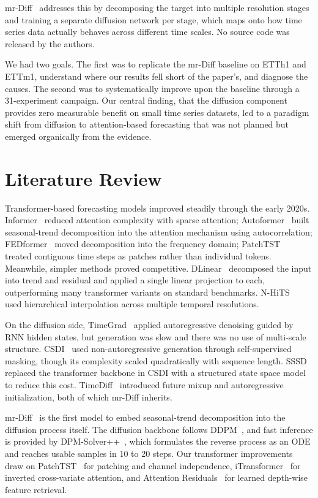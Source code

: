 \documentclass[conference]{IEEEtran}
\begin{document}
mr-Diff~\cite{mrdiff} addresses this by decomposing the target into multiple resolution stages and training a separate diffusion network per stage, which maps onto how time series data actually behaves across different time scales. No source code was released by the authors.

We had two goals. The first was to replicate the mr-Diff baseline on ETTh1 and ETTm1, understand where our results fell short of the paper's, and diagnose the causes. The second was to systematically improve upon the baseline through a 31-experiment campaign. Our central finding, that the diffusion component provides zero measurable benefit on small time series datasets, led to a paradigm shift from diffusion to attention-based forecasting that was not planned but emerged organically from the evidence.

\section{Literature Review}
Transformer-based forecasting models improved steadily through the early 2020s. Informer~\cite{informer} reduced attention complexity with sparse attention; Autoformer~\cite{autoformer} built seasonal-trend decomposition into the attention mechanism using autocorrelation; FEDformer~\cite{fedformer} moved decomposition into the frequency domain; PatchTST~\cite{patchtst} treated contiguous time steps as patches rather than individual tokens. Meanwhile, simpler methods proved competitive. DLinear~\cite{dlinear} decomposed the input into trend and residual and applied a single linear projection to each, outperforming many transformer variants on standard benchmarks. N-HiTS~\cite{nhits} used hierarchical interpolation across multiple temporal resolutions.

On the diffusion side, TimeGrad~\cite{timegrad} applied autoregressive denoising guided by RNN hidden states, but generation was slow and there was no use of multi-scale structure. CSDI~\cite{csdi} used non-autoregressive generation through self-supervised masking, though its complexity scaled quadratically with sequence length. SSSD~\cite{sssd} replaced the transformer backbone in CSDI with a structured state space model to reduce this cost. TimeDiff~\cite{timediff} introduced future mixup and autoregressive initialization, both of which mr-Diff inherits.

mr-Diff~\cite{mrdiff} is the first model to embed seasonal-trend decomposition into the diffusion process itself. The diffusion backbone follows DDPM~\cite{ddpm}, and fast inference is provided by DPM-Solver++~\cite{dpmsolver}, which formulates the reverse process as an ODE and reaches usable samples in 10 to 20 steps. Our transformer improvements draw on PatchTST~\cite{patchtst} for patching and channel independence, iTransformer~\cite{itransformer} for inverted cross-variate attention, and Attention Residuals~\cite{attnres} for learned depth-wise feature retrieval.
\end{document}
